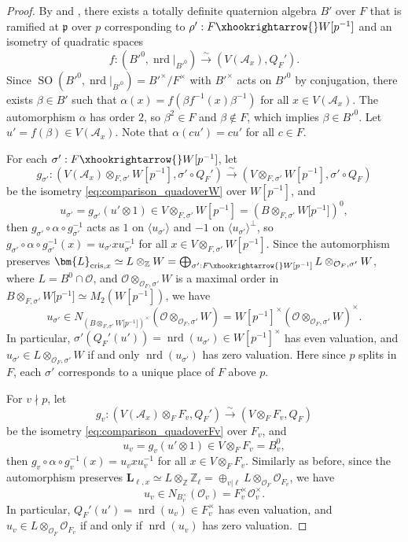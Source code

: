 \documentclass{amsart}
\numberwithin{equation}{subsection}
\numberwithin{theorem}{section}
\theoremstyle{definition}
\theoremstyle{remark}
\newcommand{\bZ}{\mathbb{Z}}
\newcommand{\cA}{\mathcal{A}}
\newcommand{\cO}{\mathcal{O}}
\newcommand{\fp}{\mathfrak{p}}
\DeclareMathOperator{\SO}{SO}
\DeclareMathOperator{\nrd}{nrd}
\begin{document}
\begin{proof}
    By  and , there exists a totally definite quaternion algebra $B'$ over $F$ that is ramified at $\fp$ over $p$ corresponding to $\rho': F\xhookrightarrow{} W[p^{-1}]$ and an isometry of quadratic spaces \begin{equation*} 
        f: (B'^{0}, \nrd|_{B'^{0}})\xrightarrow{\sim} (V(\mathcal{A}_x), Q_F').
    \end{equation*} Since $\SO(B'^0, \nrd|_{B'^{0}}) = B'^\times/F^\times$ with $B'^\times$ acts on $B'^0$ by conjugation, there exists $\beta \in B'$ such that $\alpha(x) = f(\beta f^{-1}(x) \beta^{-1}) $  for all $x\in V(\cA_x)$. The automorphism $\alpha$ has order $2$, so $\beta^2 \in F$ and $\beta\notin F$, which implies $\beta \in B'^0$. Let $u' = f(\beta) \in V(\cA_x)$. Note that $\alpha(cu') = cu'$ for all $c\in F$. 

    For each $\sigma': F\xhookrightarrow{}W[p^{-1}]$, let \[g_{\sigma'}: (V(\cA_x)\otimes_{F, \sigma'} W[p^{-1}], \sigma'\circ Q_F') \xrightarrow{\sim} (V\otimes_{F, \sigma'}W[p^{-1}], \sigma'\circ Q_F)\] be the isometry  \eqref{eq:comparison_quadoverW} over $W[p^{-1}]$, 
    and \[u_{\sigma'} = g_{\sigma'}(u'\otimes 1) \in V\otimes_{F,\sigma'} W[p^{-1}] = (B\otimes_{F, \sigma'}{W[p^{-1}}])^0,\] then $g_{\sigma'}\circ \alpha\circ g_{\sigma'}^{-1}$ acts as $1$ on $\langle u_{\sigma'}\rangle$ and $-1$ on $\langle u_{\sigma'}\rangle^{\perp}$, so $g_{\sigma'}\circ \alpha\circ g_{\sigma'}^{-1}(x) = u_{\sigma'} xu_{\sigma'}^{-1}$ for all $x\in V\otimes_{F, \sigma'} W[p^{-1}]$. Since the automorphism preserves $\bm{L}_{\mathrm{cris}, x} \simeq  L\otimes_{\bZ} W=\bigoplus_{\sigma':F\xhookrightarrow{}W[p^{-1}]}L\otimes_{\cO_F, \sigma'} W $, where $L = B^0\cap \cO$, 
    and $\cO\otimes_{\cO_F, \sigma'}W$ is a maximal order in $B\otimes_{F, \sigma'}{W[p^{-1}}]\simeq M_2(W[p^{-1}])$, we have
    \[u_{\sigma'} \in N_{(B\otimes_{F, \sigma'}{W[p^{-1}}])^\times}(\cO\otimes_{\cO_F, \sigma'}W) = W[p^{-1}]^\times (\cO\otimes_{\cO_F, \sigma'}W)^\times.\]  In particular, $\sigma'(Q_F'(u')) = \nrd(u_{\sigma'})\in W[p^{-1}]^\times$ has even valuation, and $u_{\sigma'} \in L\otimes_{\cO_F, \sigma'} W$ if and only $\nrd(u_{\sigma'})$ has zero valuation. Here since $p$ splits in $F$, each $\sigma'$ corresponds to a unique place of $F$ above $p$.

    For $v\nmid p$, let \[ g_v:  (V(\cA_x)\otimes_{F} F_v,  Q_F')\xrightarrow{\sim} (V\otimes_{F}F_v,  Q_F) \] be the isometry \eqref{eq:comparison_quadoverFv} over $F_v$, and \[u_{v}  = g_v(u'\otimes1)\in V\otimes_{F}F_v = B_v^0,\] then $g_v\circ \alpha\circ g_v^{-1}(x) = u_vxu_v^{-1}$ for all $x\in V\otimes_F F_v$. Similarly as before, since the automorphism preserves $\bm{L}_{\ell,x} \simeq L\otimes_{\bZ}\bZ_\ell = \oplus_{v|\ell} L\otimes_{\cO_F}\cO_{F_v}$, we have \[u_{v}\in N_{B_v^\times}(\cO_v) = F_v^\times \cO_v^\times.\] In particular, $Q_F'(u') = \nrd(u_v) \in F_v^\times$ has even valuation, and $u_v\in L\otimes_{\cO_F}\cO_{F_v}$ if and only if $\nrd(u_v)$ has zero valuation. 


\end{proof}
\end{document}
